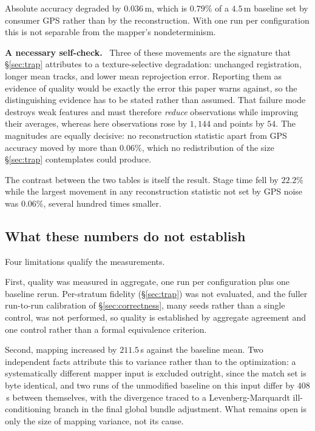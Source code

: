 \documentclass[conference]{IEEEtran}
\newcommand{\para}[1]{\smallskip\noindent\textbf{#1}\ }
\begin{document}
Absolute accuracy degraded by $0.036$\,m, which is $0.79\%$ of a $4.5$\,m
baseline set by consumer GPS rather than by the reconstruction. With one run per
configuration this is not separable from the mapper's nondeterminism.

\para{A necessary self-check.} Three of these movements are the signature that
\S\ref{sec:trap} attributes to a texture-selective degradation: unchanged
registration, longer mean tracks, and lower mean reprojection error. Reporting
them as evidence of quality would be exactly the error this paper warns against,
so the distinguishing evidence has to be stated rather than assumed. That
failure mode destroys weak features and must therefore \emph{reduce}
observations while improving their averages, whereas here observations rose by
$1{,}144$ and points by $54$. The magnitudes are equally decisive: no
reconstruction statistic apart from GPS accuracy moved by more than $0.06\%$,
which no redistribution of the size \S\ref{sec:trap} contemplates could
produce.

The contrast between the two tables is itself the result. Stage time fell by
$22.2\%$ while the largest movement in any reconstruction statistic not set by
GPS noise was $0.06\%$, several hundred times smaller.

\subsection{What these numbers do not establish}
\label{sec:notestablished}

Four limitations qualify the measurements.

First, quality was measured in aggregate, one run per configuration plus one
baseline rerun. Per-stratum fidelity (\S\ref{sec:trap}) was not evaluated,
and the fuller run-to-run calibration of \S\ref{sec:correctness}, many seeds
rather than a single control, was not performed, so quality is established by
aggregate agreement and one control rather than a formal equivalence
criterion.

Second, mapping increased by $211.5$\,s against the baseline mean. Two
independent facts attribute this to variance rather than to the optimization: a
systematically different mapper input is excluded outright, since the match set
is byte identical, and two runs of the unmodified baseline on this input differ
by $408$\,s between themselves, with the divergence traced to a
Levenberg-Marquardt ill-conditioning branch in the final global bundle
adjustment. What remains open is only the size of mapping variance, not its
cause.
\end{document}
